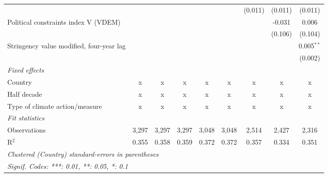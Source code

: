 \begin{tabular}{lcccccccc}
                                                  &               &               &               &                &                & (0.011)        & (0.011)       & (0.011)\\   
   Political constraints index V (VDEM)           &               &               &               &                &                &                & -0.031        & 0.006\\   
                                                  &               &               &               &                &                &                & (0.106)       & (0.104)\\   
   Stringency value modified, four-year lag       &               &               &               &                &                &                &               & 0.005$^{**}$\\   
                                                  &               &               &               &                &                &                &               & (0.002)\\   
   \emph{Fixed effects}\\
   Country                                        & x             & x             & x             & x              & x              & x              & x             & x\\  
   Half decade                                    & x             & x             & x             & x              & x              & x              & x             & x\\  
   Type of climate action/measure                 & x             & x             & x             & x              & x              & x              & x             & x\\  
   \midrule \emph{Fit statistics}\\
   Observations                                   & 3,297         & 3,297         & 3,297         & 3,048          & 3,048          & 2,514          & 2,427         & 2,316\\  
   R$^2$                                          & 0.355         & 0.358         & 0.359         & 0.372          & 0.372          & 0.357          & 0.334         & 0.351\\  
   \midrule
   \multicolumn{9}{l}{\emph{Clustered (Country) standard-errors in parentheses}}\\
   \multicolumn{9}{l}{\emph{Signif. Codes: ***: 0.01, **: 0.05, *: 0.1}}\\
\end{tabular}
\par\endgroup


